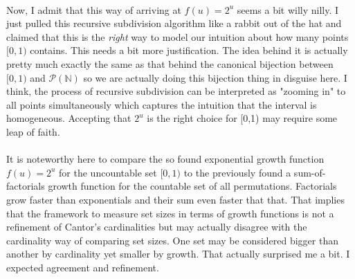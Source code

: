 \documentclass[12pt]{article}
\begin{document}

\paragraph{}
Now, I admit that this way of arriving at $f(u) = 2^u$ seems a bit willy nilly. I just pulled this recursive subdivision algorithm like a rabbit out of the hat and claimed that this is the \emph{right} way to model our intuition about how many points $[0,1)$ contains. This needs a bit more justification. The idea behind it is actually pretty much exactly the same as that behind the canonical bijection between $[0,1)$ and $\mathcal{P}(\mathbb{N})$ so we are actually doing this bijection thing in disguise here. I think, the process of recursive subdivision can be interpreted as "zooming in" to all points simultaneously which captures the intuition that the interval is homogeneous. Accepting that $2^u$ is the right choice for [0,1) may require some leap of faith.

\paragraph{}
It is noteworthy here to compare the so found exponential growth function $f(u) = 2^u$ for the uncountable set $[0,1)$ to the previously found a sum-of-factorials growth function for the countable set of all permutations. Factorials grow faster than exponentials and their sum even faster that that. That implies that the framework to measure set sizes in terms of growth functions is not a refinement of Cantor's cardinalities but may actually disagree with the cardinality way of comparing set sizes. One set may be considered bigger than another by cardinality yet smaller by growth. That actually surprised me a bit. I expected agreement and refinement.

\end{document}
